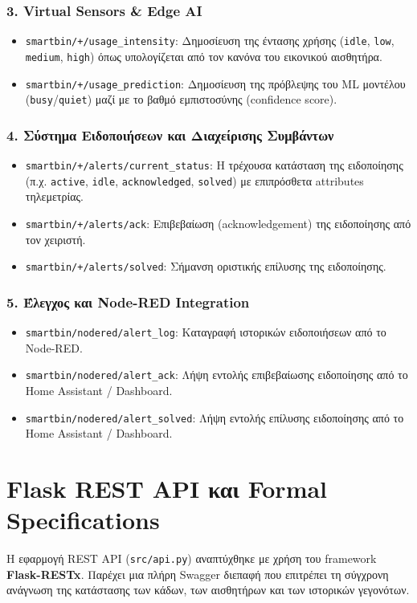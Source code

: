 \documentclass[acmsmall,screen,nonacm]{acmart}
\begin{document}
	\subsubsection{3. Virtual Sensors \& Edge AI}
	\begin{itemize}
		\item \texttt{smartbin/+/usage\_intensity}: Δημοσίευση της έντασης χρήσης (\texttt{idle}, \texttt{low}, \texttt{medium}, \texttt{high}) όπως υπολογίζεται από τον κανόνα του εικονικού αισθητήρα.
		\item \texttt{smartbin/+/usage\_prediction}: Δημοσίευση της πρόβλεψης του ML μοντέλου (\texttt{busy}/\texttt{quiet}) μαζί με το βαθμό εμπιστοσύνης (confidence score).
	\end{itemize}

	\subsubsection{4. Σύστημα Ειδοποιήσεων και Διαχείρισης Συμβάντων }
	\begin{itemize}
		\item \texttt{smartbin/+/alerts/current\_status}: Η τρέχουσα κατάσταση της ειδοποίησης (π.χ. \texttt{active}, \texttt{idle}, \texttt{acknowledged}, \texttt{solved}) με επιπρόσθετα attributes τηλεμετρίας.
		\item \texttt{smartbin/+/alerts/ack}: Επιβεβαίωση (acknowledgement) της ειδοποίησης από τον χειριστή.
		\item \texttt{smartbin/+/alerts/solved}: Σήμανση οριστικής επίλυσης της ειδοποίησης.
	\end{itemize}

	\subsubsection{5. Έλεγχος και Node-RED Integration}
	\begin{itemize}
		\item \texttt{smartbin/nodered/alert\_log}: Καταγραφή ιστορικών ειδοποιήσεων από το Node-RED.
		\item \texttt{smartbin/nodered/alert\_ack}: Λήψη εντολής επιβεβαίωσης ειδοποίησης από το Home Assistant / Dashboard.
		\item \texttt{smartbin/nodered/alert\_solved}: Λήψη εντολής επίλυσης ειδοποίησης από το Home Assistant / Dashboard.
	\end{itemize}
	
	\section{Flask REST API και Formal Specifications}
	Η εφαρμογή REST API (\texttt{src/api.py}) αναπτύχθηκε με χρήση του framework \textbf{Flask-RESTx}. Παρέχει μια πλήρη Swagger διεπαφή που επιτρέπει τη σύγχρονη ανάγνωση της κατάστασης των κάδων, των αισθητήρων και των ιστορικών γεγονότων. 
	
\end{document}
